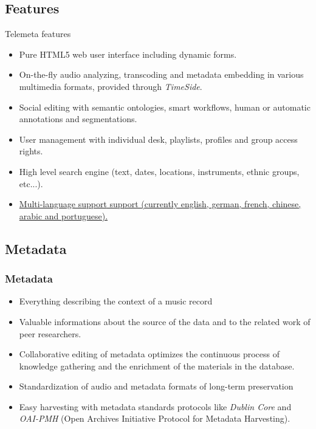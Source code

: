 \documentclass[final, hyperref, table]{beamer}
\begin{document}
\subsection{Features}
\begin{frame}[label=telemeta_features]{Telemeta features}
  \begin{block}{}
    \begin{itemize}
      \item \alert{Pure HTML5} web user interface including dynamic forms.
      \item \alert{On-the-fly audio analyzing}, transcoding and metadata
        embedding in various multimedia formats, provided through \emph{TimeSide}.
      \item \alert{Social editing} with semantic ontologies, smart workflows, human or automatic annotations and segmentations.
      \item \alert{User management} with individual desk, playlists, profiles
        and group access rights.
      \item \alert{High level search engine} (text, dates, locations, instruments, ethnic groups, etc...).
      \item \hyperlink{telemeta_languages}{\alert{Multi-language support} support (currently english, german, french, chinese, arabic and portuguese).}
      \end{itemize}
    \end{block}
\end{frame}


\subsection{Metadata}\label{sec:metadata}
\begin{frame}\frametitle{Metadata}
  \begin{block}{}
    \begin{itemize}
    \item Everything describing the context of a music record
    \item Valuable informations about the \alert{source of the data} and to the related \alert{work of
        peer researchers}.
    \item \alert{Collaborative editing} of metadata optimizes the continuous process of knowledge gathering
      and the \alert{enrichment} of the materials in the database.
    \item \alert{Standardization} of audio and metadata formats of long-term preservation
    \item \alert{Easy harvesting} with metadata standards protocols like
      \emph{Dublin Core} and \emph{OAI-PMH} (Open Archives Initiative
      Protocol for Metadata Harvesting).
    \end{itemize}
  \end{block}
\end{frame}
\end{document}

